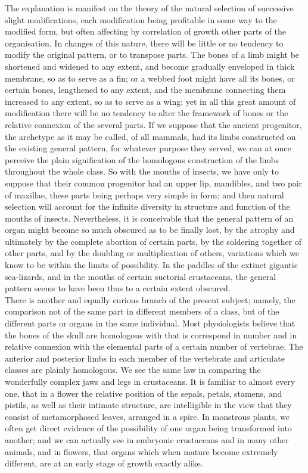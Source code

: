 \indent The explanation is manifest on the theory of the natural selection of successive slight modifications, each modification being profitable in some way to the modified form, but often affecting by correlation of growth other parts of the organisation. In changes of this nature, there will be little or no tendency to modify the original pattern, or to transpose parts. The bones of a limb might be shortened and widened to any extent, and become gradually enveloped in thick membrane, so as to serve as a fin; or a webbed foot might have all its bones, or certain bones, lengthened to any extent, and the membrane connecting them increased to any extent, so as to serve as a wing: yet in all this great amount of modification there will be no tendency to alter the framework of bones or the relative connexion of the several parts. If we suppose that the ancient progenitor, the archetype as it may be called, of all mammals, had its limbs constructed on the existing general pattern, for whatever purpose they served, we can at once perceive the plain signification of the homologous construction of the limbs throughout the whole class. So with the mouths of insects, we have only to suppose that their common progenitor had an upper lip, mandibles, and two pair of maxillae, these parts being perhaps very simple in form; and then natural selection will account for the infinite diversity in structure and function of the mouths of insects. Nevertheless, it is conceivable that the general pattern of an organ might become so much obscured as to be finally lost, by the atrophy and ultimately by the complete abortion of certain parts, by the soldering together of other parts, and by the doubling or multiplication of others, variations which we know to be within the limits of possibility. In the paddles of the extinct gigantic sea-lizards, and in the mouths of certain suctorial crustaceans, the general pattern seems to have been thus to a certain extent obscured.~\\
\indent There is another and equally curious branch of the present subject; namely, the comparison not of the same part in different members of a class, but of the different parts or organs in the same individual. Most physiologists believe that the bones of the skull are homologous with that is correspond in number and in relative connexion with the elemental parts of a certain number of vertebrae. The anterior and posterior limbs in each member of the vertebrate and articulate classes are plainly homologous. We see the same law in comparing the wonderfully complex jaws and legs in crustaceans. It is familiar to almost every one, that in a flower the relative position of the sepals, petals, stamens, and pistils, as well as their intimate structure, are intelligible in the view that they consist of metamorphosed leaves, arranged in a spire. In monstrous plants, we often get direct evidence of the possibility of one organ being transformed into another; and we can actually see in embryonic crustaceans and in many other animals, and in flowers, that organs which when mature become extremely different, are at an early stage of growth exactly alike.~\\
